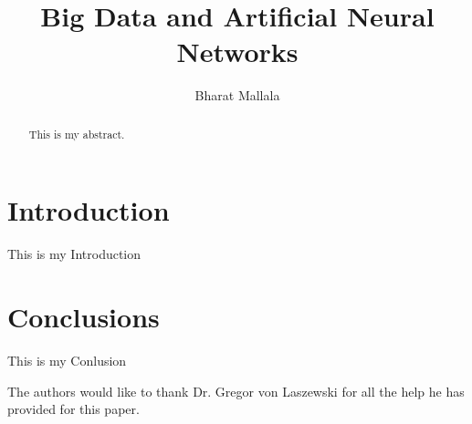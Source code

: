 \documentclass[sigconf]{acmart}
\begin{document}
\title{Big Data and Artificial Neural Networks}



\author{Bharat Mallala}


\renewcommand{\shortauthors}{B. Trovato et al.}


\begin{abstract}
This is my abstract.
\end{abstract}



\maketitle

\section{Introduction}
This is my Introduction


\section{Conclusions}

This is my Conlusion


\begin{acks}

  The authors would like to thank Dr. Gregor von Laszewski for all the help he has provided for this paper.
\end{acks}


 
\end{document}
